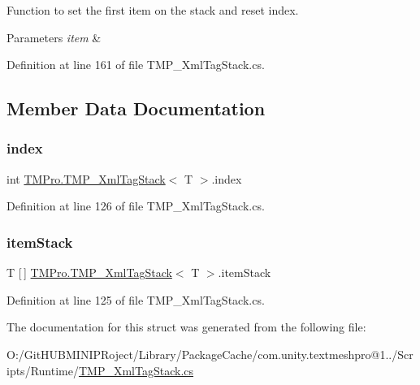 Function to set the first item on the stack and reset index. 


\begin{DoxyParams}{Parameters}
{\em item} & \\
\hline
\end{DoxyParams}


Definition at line 161 of file T\+M\+P\+\_\+\+Xml\+Tag\+Stack.\+cs.



\subsection{Member Data Documentation}
\mbox{\label{struct_t_m_pro_1_1_t_m_p___xml_tag_stack_a86973ba411e6666b64578385fa858f1e}} 
\subsubsection{\texorpdfstring{index}{index}}
{\footnotesize\ttfamily int \mbox{\hyperlink{struct_t_m_pro_1_1_t_m_p___xml_tag_stack}{T\+M\+Pro.\+T\+M\+P\+\_\+\+Xml\+Tag\+Stack}}$<$ T $>$.index}



Definition at line 126 of file T\+M\+P\+\_\+\+Xml\+Tag\+Stack.\+cs.

\mbox{\label{struct_t_m_pro_1_1_t_m_p___xml_tag_stack_ae62de73842140b895d45c09ffe3a36ee}} 
\subsubsection{\texorpdfstring{itemStack}{itemStack}}
{\footnotesize\ttfamily T \mbox{[}$\,$\mbox{]} \mbox{\hyperlink{struct_t_m_pro_1_1_t_m_p___xml_tag_stack}{T\+M\+Pro.\+T\+M\+P\+\_\+\+Xml\+Tag\+Stack}}$<$ T $>$.item\+Stack}



Definition at line 125 of file T\+M\+P\+\_\+\+Xml\+Tag\+Stack.\+cs.



The documentation for this struct was generated from the following file\+:\begin{DoxyCompactItemize}
\item 
O\+:/\+Git\+H\+U\+B\+M\+I\+N\+I\+P\+Roject/\+Library/\+Package\+Cache/com.\+unity.\+textmeshpro@1../\+Scripts/\+Runtime/\mbox{\hyperlink{_t_m_p___xml_tag_stack_8cs}{T\+M\+P\+\_\+\+Xml\+Tag\+Stack.\+cs}}\end{DoxyCompactItemize}
